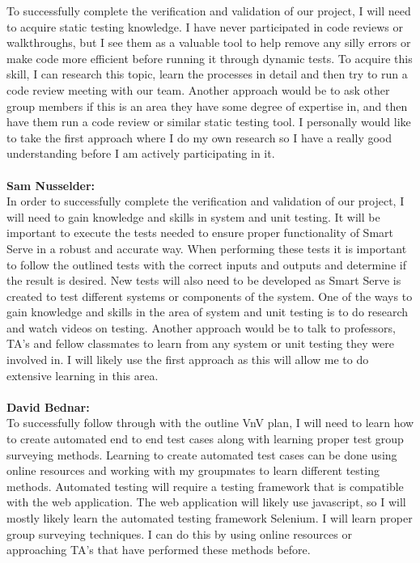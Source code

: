 \documentclass[12pt, titlepage]{article}
\begin{document}
\indent
To successfully complete the verification and validation of our project, I will need to acquire static testing knowledge. I have never participated in code reviews or walkthroughs, but I see them as a valuable tool to help remove any silly errors or make code more efficient before running it through dynamic tests. To acquire this skill, I can research this topic, learn the processes in detail and then try to run a code review meeting with our team. Another approach would be to ask other group members if this is an area they have some degree of expertise in, and then have them run a code review or similar static testing tool. I personally would like to take the first approach where I do my own research so I have a really good understanding before I am actively participating in it.
\\\\
\noindent\textbf{Sam Nusselder:} \\
\indent
In order to successfully complete the verification and validation of our project, I will need to gain knowledge and skills in system and unit testing. It will be important to execute the tests needed to ensure proper functionality of Smart Serve in a robust and accurate way. When performing these tests it is important to follow the outlined tests with the correct inputs and outputs and determine if the result is desired. New tests will also need to be developed as Smart Serve is created to test different systems or components of the system. One of the ways to gain knowledge and skills in the area of system and unit testing is to do research and watch videos on testing. Another approach would be to talk to professors, TA's and fellow classmates to learn from any system or unit testing they were involved in. I will likely use the first approach as this will allow me to do extensive learning in this area.
\\\\
\noindent\textbf{David Bednar:} \\
\indent
To successfully follow through with the outline VnV plan, I will need to learn how to create automated end to end test cases along with learning proper test group surveying methods. Learning to create automated test cases can be done using online resources and working with my groupmates to learn different testing methods. Automated testing will require a testing framework that is compatible with the web application. The web application will likely use javascript, so I will mostly likely learn the automated testing framework Selenium. I will learn proper group surveying techniques. I can do this by using online resources or approaching TA’s that have performed these methods before.
\indent
\end{document}
